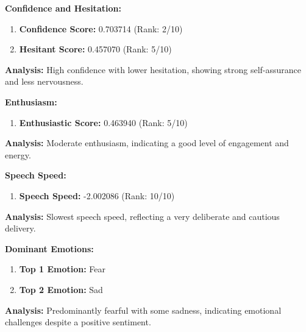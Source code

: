\documentclass{article}
\begin{document}
\large{\textbf{Confidence and Hesitation:}}
\begin{tcolorbox}[colback=green!5!white,colframe=green!75!black,title=Confidence and Hesitant Scores]
    \begin{enumerate}
        \item \textbf{Confidence Score:} \textcolor{green!50!black}{0.703714} (Rank: 2/10)
        \item \textbf{Hesitant Score:} \textcolor{red!70!black}{0.457070} (Rank: 5/10)
    \end{enumerate}
\end{tcolorbox}
    \textbf{Analysis:} High confidence with lower hesitation, showing strong self-assurance and less nervousness.

\large{\textbf{Enthusiasm:}}
\begin{tcolorbox}[ colback=purple!5!white,colframe=purple!75!black,  title=Enthusiastic Score]
    \begin{enumerate}
        \item \textbf{Enthusiastic Score:} \textcolor{orange!70!black}{0.463940} (Rank: 5/10)
    \end{enumerate}
\end{tcolorbox}
    \textbf{Analysis:} Moderate enthusiasm, indicating a good level of engagement and energy.

\large{\textbf{Speech Speed:}}

\begin{tcolorbox}[ colback=cyan!5!white, colframe=cyan!75!black,  title=Speech Speed]
    \begin{enumerate}
        \item \textbf{Speech Speed:} \textcolor{purple!70!black}{-2.002086} (Rank: 10/10)
    \end{enumerate}
\end{tcolorbox}
    \textbf{Analysis:} Slowest speech speed, reflecting a very deliberate and cautious delivery.

\large{\textbf{Dominant Emotions:}}
\begin{tcolorbox}[colback=blue!5!white,colframe=blue!75!black,title=Emotional State]
    \begin{enumerate}
        \item \textbf{Top 1 Emotion:} \textcolor{red!80!black}{Fear}
        \item \textbf{Top 2 Emotion:} \textcolor{blue!80!black}{Sad}
    \end{enumerate}
\end{tcolorbox}
    \textbf{Analysis:} Predominantly fearful with some sadness, indicating emotional challenges despite a positive sentiment.
\end{document}
